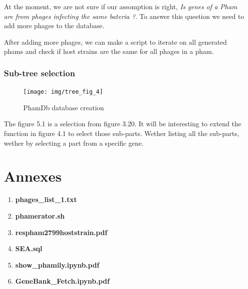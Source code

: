 \documentclass[a4paper,11pt]{report}
\begin{document}
At the moment, we are not sure if our assomption is right, \textit{Is genes of a Pham are from phages infecting the same bateria ?}. To answer this question we need to add more phages to the database.

After adding more phages, we can make a script to iterate on all generated phams and check if host strains are the same for all phages in a pham.

\subsection{Sub-tree selection}
\begin{figure}[H] 
	\begin{center}
		\texttt{[image: img/tree\_fig\_4]}
		\caption{PhamDb database creation}
	\end{center}
\end{figure}

The figure 5.1 is a selection from figure 3.20. It will be interesting to extend the function in figure 4.1 to select those sub-parts. Wether listing all the sub-parts, wether by selecting a part from a specific gene.

\addtocounter{chapter}{1}
\listoffigures

\addtocounter{chapter}{1}


\chapter{Annexes}
\begin{enumerate}
	\item \textbf{phages\_list\_1.txt}
	\item \textbf{phamerator.sh}
	\item \textbf{respham2799hoststrain.pdf}
	\item \textbf{SEA.sql}
	\item \textbf{show\_phamily.ipynb.pdf}
	\item \textbf{GeneBank\_Fetch.ipynb.pdf}
\end{enumerate}
\end{document}
